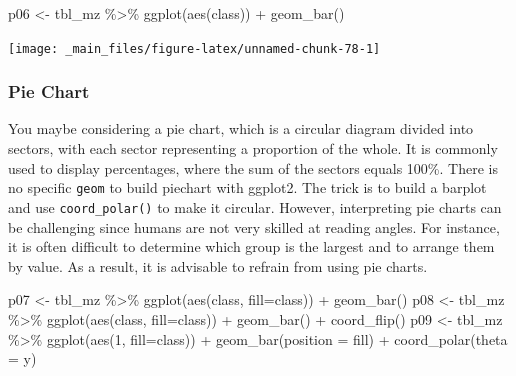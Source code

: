 \documentclass[
]{book}
\newenvironment{Shaded}{\begin{snugshade}}{\end{snugshade}}
\newcommand{\AttributeTok}[1]{\textcolor[rgb]{0.77,0.63,0.00}{#1}}
\newcommand{\DecValTok}[1]{\textcolor[rgb]{0.00,0.00,0.81}{#1}}
\newcommand{\FunctionTok}[1]{\textcolor[rgb]{0.00,0.00,0.00}{#1}}
\newcommand{\NormalTok}[1]{#1}
\newcommand{\OtherTok}[1]{\textcolor[rgb]{0.56,0.35,0.01}{#1}}
\newcommand{\SpecialCharTok}[1]{\textcolor[rgb]{0.00,0.00,0.00}{#1}}
\newcommand{\StringTok}[1]{\textcolor[rgb]{0.31,0.60,0.02}{#1}}
\begin{document}
\begin{Shaded}
\begin{Highlighting}[]
\NormalTok{p06 }\OtherTok{\textless{}{-}}\NormalTok{ tbl\_mz }\SpecialCharTok{\%\textgreater{}\%} \FunctionTok{ggplot}\NormalTok{(}\FunctionTok{aes}\NormalTok{(class)) }\SpecialCharTok{+} \FunctionTok{geom\_bar}\NormalTok{()}
\end{Highlighting}
\end{Shaded}

\begin{center}\texttt{[image: \_main\_files/figure-latex/unnamed-chunk-78-1]} \end{center}

\hypertarget{pie-chart}{%
\subsubsection*{Pie Chart}\label{pie-chart}}

You maybe considering a pie chart, which is a circular diagram divided into sectors, with each sector representing a proportion of the whole. It is commonly used to display percentages, where the sum of the sectors equals 100\%. There is no specific \texttt{geom} to build piechart with ggplot2. The trick is to build a barplot and use \texttt{coord\_polar()} to make it circular. However, interpreting pie charts can be challenging since humans are not very skilled at reading angles. For instance, it is often difficult to determine which group is the largest and to arrange them by value. As a result, it is advisable to refrain from using pie charts.

\begin{Shaded}
\begin{Highlighting}[]
\NormalTok{p07 }\OtherTok{\textless{}{-}}\NormalTok{ tbl\_mz }\SpecialCharTok{\%\textgreater{}\%} \FunctionTok{ggplot}\NormalTok{(}\FunctionTok{aes}\NormalTok{(class, }\AttributeTok{fill=}\NormalTok{class)) }\SpecialCharTok{+} \FunctionTok{geom\_bar}\NormalTok{()}
\NormalTok{p08 }\OtherTok{\textless{}{-}}\NormalTok{ tbl\_mz }\SpecialCharTok{\%\textgreater{}\%} \FunctionTok{ggplot}\NormalTok{(}\FunctionTok{aes}\NormalTok{(class, }\AttributeTok{fill=}\NormalTok{class)) }\SpecialCharTok{+} \FunctionTok{geom\_bar}\NormalTok{() }\SpecialCharTok{+} \FunctionTok{coord\_flip}\NormalTok{()}
\NormalTok{p09 }\OtherTok{\textless{}{-}}\NormalTok{ tbl\_mz }\SpecialCharTok{\%\textgreater{}\%} \FunctionTok{ggplot}\NormalTok{(}\FunctionTok{aes}\NormalTok{(}\DecValTok{1}\NormalTok{, }\AttributeTok{fill=}\NormalTok{class)) }\SpecialCharTok{+} \FunctionTok{geom\_bar}\NormalTok{(}\AttributeTok{position =} \StringTok{\textquotesingle{}fill\textquotesingle{}}\NormalTok{) }\SpecialCharTok{+} \FunctionTok{coord\_polar}\NormalTok{(}\AttributeTok{theta =} \StringTok{\textquotesingle{}y\textquotesingle{}}\NormalTok{)}
\end{Highlighting}
\end{Shaded}
\end{document}
